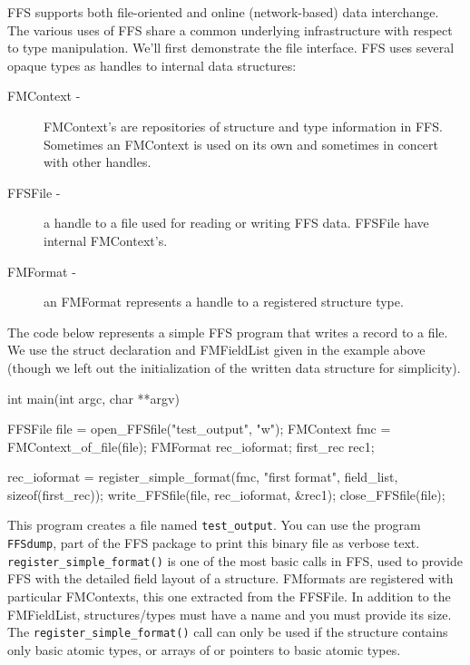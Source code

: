 FFS supports both file-oriented and online (network-based) data
interchange.  The various uses of FFS share a common underlying
infrastructure with respect to type manipulation.  We'll first demonstrate
the file interface.  FFS uses several opaque types as handles to internal
data structures:
\begin{description}
\item[FMContext -] FMContext's are repositories of structure and type
  information in FFS.   Sometimes an FMContext is used on its own and
  sometimes in concert with other handles.
\item[FFSFile -] a handle to a file used for reading or writing FFS data.
  FFSFile have internal FMContext's.
\item[FMFormat - ] an FMFormat represents a handle to a registered structure
  type.
\end{description}
The code below represents a simple FFS program that writes a record to a
file.  We use the struct declaration and FMFieldList given in the example
above (though we left out the initialization of the written data structure
for simplicity).
\begin{Code}
int main(int argc, char **argv)
{
    FFSFile file = open_FFSfile("test_output", "w");
    FMContext fmc = FMContext_of_file(file);
    FMFormat rec_ioformat;
    first_rec rec1;

    rec_ioformat = register_simple_format(fmc, "first format", field_list, sizeof(first_rec));
    write_FFSfile(file, rec_ioformat, &rec1);
    close_FFSfile(file);
}
\end{Code}
This program creates a file named {\tt test_output}.  You can use the
program {\tt FFSdump}, part of the FFS package to print this binary file as
verbose text.  {\tt register_simple_format()} is one of the most basic calls
in FFS, used to provide FFS with the detailed field layout of a structure.
FMformats are registered with particular FMContexts, this one extracted from
the FFSFile.  In addition to the FMFieldList, structures/types must have a
name and you must provide its size.  The {\tt register_simple_format()} call
can only be used if the structure contains only basic atomic types, or arrays of
or pointers to basic atomic types.

